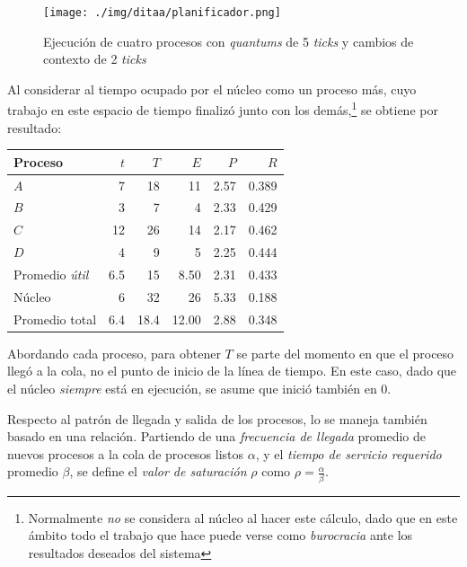 \documentclass[11pt,fleqn]{book} %
\begin{document}
\begin{figure}[htb]
\centering
\texttt{[image: ./img/ditaa/planificador.png]}
\caption{\label{PLAN_planificador}Ejecución de cuatro procesos con \emph{quantums} de 5 \emph{ticks} y cambios de contexto de 2 \emph{ticks}}
\end{figure}

Al considerar al tiempo ocupado por el núcleo como un proceso más,
cuyo trabajo en este espacio de tiempo finalizó junto con los
demás,\footnote{Normalmente \emph{no} se considera al núcleo al hacer este
cálculo, dado que en este ámbito todo el trabajo que hace puede verse
como \emph{burocracia} ante los resultados deseados del sistema } se obtiene
por resultado:


\begin{center}
\begin{tabular}{lrrrrr}
 Proceso               &  $t$  &   $T$  &    $E$  &   $P$  &    $R$  \\
\hline
 $A$                   &    7  &    18  &     11  &  2.57  &  0.389  \\
 $B$                   &    3  &     7  &      4  &  2.33  &  0.429  \\
 $C$                   &   12  &    26  &     14  &  2.17  &  0.462  \\
 $D$                   &    4  &     9  &      5  &  2.25  &  0.444  \\
 Promedio \emph{útil}  &  6.5  &    15  &   8.50  &  2.31  &  0.433  \\
\hline
 Núcleo                &    6  &    32  &     26  &  5.33  &  0.188  \\
\hline
 Promedio total        &  6.4  &  18.4  &  12.00  &  2.88  &  0.348  \\
\end{tabular}
\end{center}



Abordando cada proceso, para obtener $T$ se parte del momento en que
el proceso llegó a la cola, no el punto de inicio de la línea de
tiempo. En este caso, dado que el núcleo \emph{siempre} está en ejecución,
se asume que inició también en 0.

Respecto al patrón de llegada y salida de los procesos, lo se maneja
también basado en una relación. Partiendo de una \emph{frecuencia de llegada} promedio de nuevos procesos a la cola de procesos listos
$\alpha$, y el \emph{tiempo de servicio requerido} promedio $\beta$,
se define el \emph{valor de saturación} $\rho$ como $\rho =
\frac{\alpha}{\beta}$.
\end{document}
